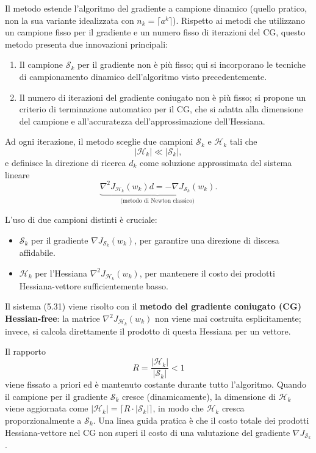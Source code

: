 \documentclass[a4paper,12pt]{article}
\numberwithin{equation}{section}
\numberwithin{figure}{section}
\numberwithin{table}{section}
\begin{document}
Il metodo estende l'algoritmo del gradiente a campione dinamico (quello pratico, non la sua variante idealizzata con \(n_k = \lceil a^k \rceil\)). Rispetto ai metodi che utilizzano un campione fisso per il gradiente e un numero fisso di iterazioni del CG, questo metodo presenta due innovazioni principali:

\begin{enumerate}
    \item Il campione \(\mathcal{S}_k\) per il gradiente non è più fisso; qui si incorporano le tecniche di campionamento dinamico dell'algoritmo visto precedentemente.
    \item Il numero di iterazioni del gradiente coniugato non è più fisso; si propone un criterio di terminazione automatico per il CG, che si adatta alla dimensione del campione e all'accuratezza dell'approssimazione dell'Hessiana.
\end{enumerate}

Ad ogni iterazione, il metodo sceglie due campioni \(\mathcal{S}_k\) e \(\mathcal{H}_k\) tali che
\[
|\mathcal{H}_k| \ll |\mathcal{S}_k|,
\]
e definisce la direzione di ricerca \(d_k\) come soluzione approssimata del sistema lineare
\[
\underbrace{\nabla^2 J_{\mathcal{H}_k}(w_k) d = -\nabla J_{\mathcal{S}_k}(w_k)}_{\text{(metodo di Newton classico)}}. \tag{5.31}
\]

L'uso di due campioni distinti è cruciale:
\begin{itemize}
    \item \(\mathcal{S}_k\) per il gradiente \(\nabla J_{\mathcal{S}_k}(w_k)\), per garantire una direzione di discesa affidabile.
    \item \(\mathcal{H}_k\) per l'Hessiana \(\nabla^2 J_{\mathcal{H}_k}(w_k)\), per mantenere il costo dei prodotti Hessiana-vettore sufficientemente basso.
\end{itemize}

Il sistema (5.31) viene risolto con il \textbf{metodo del gradiente coniugato (CG) Hessian-free}: la matrice \(\nabla^2 J_{\mathcal{H}_k}(w_k)\) non viene mai costruita esplicitamente; invece, si calcola direttamente il prodotto di questa Hessiana per un vettore.

Il rapporto
\[
R = \frac{|\mathcal{H}_k|}{|\mathcal{S}_k|} < 1 \tag{5.32}
\]
viene fissato a priori ed è mantenuto costante durante tutto l'algoritmo. Quando il campione per il gradiente \(\mathcal{S}_k\) cresce (dinamicamente), la dimensione di \(\mathcal{H}_k\) viene aggiornata come \(|\mathcal{H}_k| = \lceil R \cdot |\mathcal{S}_k|\rceil\), in modo che \(\mathcal{H}_k\) cresca proporzionalmente a \(\mathcal{S}_k\). Una linea guida pratica è che il costo totale dei prodotti Hessiana-vettore nel CG non superi il costo di una valutazione del gradiente \(\nabla J_{\mathcal{S}_k}\).
\end{document}
